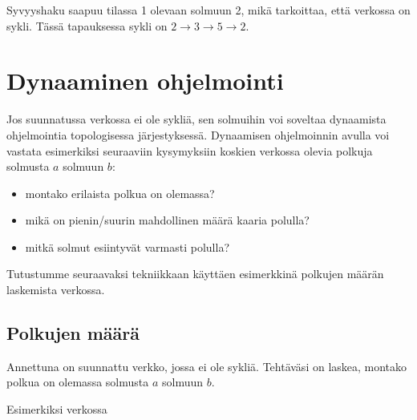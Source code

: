 Syvyyshaku saapuu tilassa 1 olevaan solmuun 2,
mikä tarkoittaa, että verkossa on sykli.
Tässä tapauksessa sykli on $2 \rightarrow 3 \rightarrow 5 \rightarrow 2$.

\section{Dynaaminen ohjelmointi}

Jos suunnatussa verkossa ei ole sykliä, sen solmuihin voi
soveltaa dynaamista ohjelmointia topologisessa järjestyksessä.
Dynaamisen ohjelmoinnin avulla voi vastata esimerkiksi seuraaviin
kysymyksiin koskien verkossa olevia polkuja solmusta $a$ solmuun $b$:

\begin{itemize}
\item montako erilaista polkua on olemassa?
\item mikä on pienin/suurin mahdollinen määrä kaaria polulla?
\item mitkä solmut esiintyvät varmasti polulla?
\end{itemize}

Tutustumme seuraavaksi tekniikkaan käyttäen
esimerkkinä polkujen määrän laskemista verkossa.

\subsection{Polkujen määrä}

\begin{task}
Annettuna on suunnattu verkko, jossa ei ole sykliä.
Tehtäväsi on laskea, montako polkua on olemassa
solmusta $a$ solmuun $b$.
\end{task}

\begin{samepage}
Esimerkiksi verkossa

\begin{center}
\end{center}
\end{samepage}

